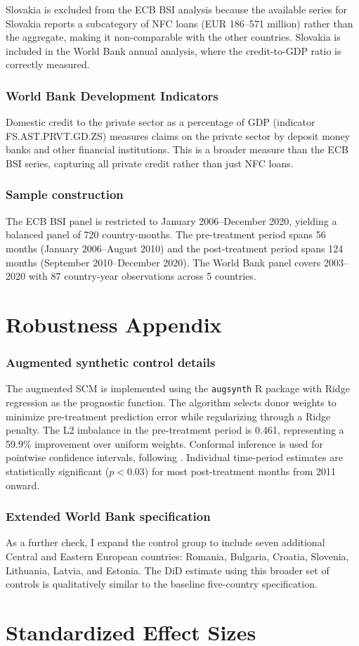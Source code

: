 \documentclass[12pt]{article}
\begin{document}
Slovakia is excluded from the ECB BSI analysis because the available series for Slovakia reports a subcategory of NFC loans (EUR 186--571 million) rather than the aggregate, making it non-comparable with the other countries. Slovakia is included in the World Bank annual analysis, where the credit-to-GDP ratio is correctly measured.

\subsubsection*{World Bank Development Indicators} Domestic credit to the private sector as a percentage of GDP (indicator FS.AST.PRVT.GD.ZS) measures claims on the private sector by deposit money banks and other financial institutions. This is a broader measure than the ECB BSI series, capturing all private credit rather than just NFC loans.

\subsubsection*{Sample construction} The ECB BSI panel is restricted to January 2006--December 2020, yielding a balanced panel of 720 country-months. The pre-treatment period spans 56 months (January 2006--August 2010) and the post-treatment period spans 124 months (September 2010--December 2020). The World Bank panel covers 2003--2020 with 87 country-year observations across 5 countries.

\section{Robustness Appendix}

\subsubsection*{Augmented synthetic control details} The augmented SCM \citep{ben2021} is implemented using the \texttt{augsynth} R package with Ridge regression as the prognostic function. The algorithm selects donor weights to minimize pre-treatment prediction error while regularizing through a Ridge penalty. The L2 imbalance in the pre-treatment period is 0.461, representing a 59.9\% improvement over uniform weights. Conformal inference is used for pointwise confidence intervals, following \citet{chernozhukov2021}. Individual time-period estimates are statistically significant ($p < 0.03$) for most post-treatment months from 2011 onward.

\subsubsection*{Extended World Bank specification} As a further check, I expand the control group to include seven additional Central and Eastern European countries: Romania, Bulgaria, Croatia, Slovenia, Lithuania, Latvia, and Estonia. The DiD estimate using this broader set of controls is qualitatively similar to the baseline five-country specification.


\section{Standardized Effect Sizes}
\label{sec:sde}


\end{document}
